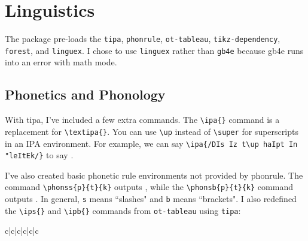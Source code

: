 \documentclass[11pt]{article}
\begin{document}
\section{Linguistics}
The package pre-loads the \texttt{tipa}, \texttt{phonrule}, \texttt{ot-tableau}, \texttt{tikz-dependency}, \texttt{forest}, and \texttt{linguex}. I chose to use \texttt{linguex} rather than \texttt{gb4e} because gb4e runs into an error with math mode.

\subsection{Phonetics and Phonology}
With tipa, I've included a few extra commands. The \verb|\ipa{}| command is a replacement for \verb|\textipa{}|. You can use \verb|\up| instead of \verb|\super| for superscripts in an IPA environment. For example, we can say \verb|\ipa{/DIs Iz t\up haIpt In "leItEk/}| to say .

I've also created basic phonetic rule environments not provided by phonrule. The command \verb|\phonss{p}{t}{k}| outputs , while the \verb|\phonsb{p}{t}{k}| command outputs . In general, \verb|s| means ``slashes" and \verb|b| means ``brackets". I also redefined the \verb|\ips{}| and \verb|\ipb{}| commands from \texttt{ot-tableau} using \texttt{tipa}:

\begin{center}
	\begin{tableau}{c|c|c|c|c|c}
	  \const{*[+low]} \const{*[+round]} \const{*[-back]}  \const{*[+high]}
	 \vio{} \vio{*} \vio{*} \vio{} \vio{**!} \vio{}
	 \vio{} \vio{*} \vio{*} \vio{} \vio{*} \vio{*}
	 \vio{} \vio{*} \vio{*} \vio{*!} \vio{*} \vio{*}
	 \vio{} \vio{*} \vio{**!} \vio{} \vio{*} \vio{*}
	 \vio{} \vio{**!} \vio{*} \vio{} \vio{**} \vio{}
	 \vio{*!*} \vio{} \vio{} \vio{} \vio{} \vio{**}
	\end{tableau}
\end{center}
\end{document}
